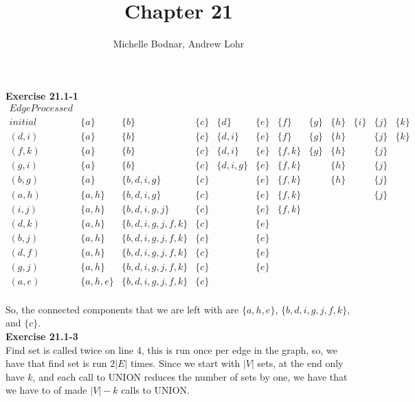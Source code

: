 \documentclass{article}
\title{Chapter 21}
\author{Michelle Bodnar, Andrew Lohr}
\begin{document}
\maketitle


\noindent\textbf{Exercise 21.1-1}\\
$
\begin{array}{c|ccccccccccc}
Edge Processed&&&&&&&&&&&\\
\hline
initial&\{a\}&\{b\}&\{c\}&\{d\}&\{e\}&\{f\}&\{g\}&\{h\}&\{i\}&\{j\}&\{k\}\\
(d,i)&\{a\}&\{b\}&\{c\}&\{d,i\}&\{e\}&\{f\}&\{g\}&\{h\}&&\{j\}&\{k\}\\
(f,k)&\{a\}&\{b\}&\{c\}&\{d,i\}&\{e\}&\{f,k\}&\{g\}&\{h\}&&\{j\}&\\
(g,i)&\{a\}&\{b\}&\{c\}&\{d,i,g\}&\{e\}&\{f,k\}&&\{h\}&&\{j\}&\\
(b,g)&\{a\}&\{b,d,i,g\}&\{c\}&&\{e\}&\{f,k\}&&\{h\}&&\{j\}&\\
(a,h)&\{a,h\}&\{b,d,i,g\}&\{c\}&&\{e\}&\{f,k\}&&&&\{j\}&\\
(i,j)&\{a,h\}&\{b,d,i,g,j\}&\{c\}&&\{e\}&\{f,k\}&&&&&\\
(d,k)&\{a,h\}&\{b,d,i,g,j,f,k\}&\{c\}&&\{e\}&&&&&&\\
(b,j)&\{a,h\}&\{b,d,i,g,j,f,k\}&\{c\}&&\{e\}&&&&&&\\
(d,f)&\{a,h\}&\{b,d,i,g,j,f,k\}&\{c\}&&\{e\}&&&&&&\\
(g,j)&\{a,h\}&\{b,d,i,g,j,f,k\}&\{c\}&&\{e\}&&&&&&\\
(a,e)&\{a,h,e\}&\{b,d,i,g,j,f,k\}&\{c\}&&&&&&&&\\
\end{array}
$

So, the connected components that we are left with are $\{a,h,e\}$, $\{b,d,i,g,j,f,k\}$, and $\{c\}$.\\

\noindent\textbf{Exercise 21.1-3}\\
Find set is called twice on line 4, this is run once per edge in the graph, so, we have that find set is run $2|E|$ times. Since we start with $|V|$ sets, at the end only have $k$, and each call to UNION reduces the number of sets by one, we have that we have to of made $|V|-k$ calls to UNION.\\
\end{document}
